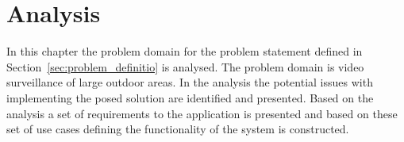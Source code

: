 \chapter{Analysis}
In this chapter the problem domain for the problem statement defined in Section~\ref{sec:problem_definitio} is analysed.
The problem domain is video surveillance of large outdoor areas.
In the analysis the potential issues with implementing the posed solution are identified and presented.
Based on the analysis a set of requirements to the application is presented and based on these set of use cases defining the functionality of the system is constructed.





